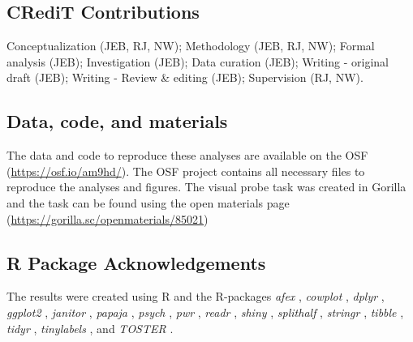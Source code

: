 \documentclass[empirical, authordate]{jote-new-article}
\begin{document}
\subsection{CRediT Contributions}

Conceptualization (JEB, RJ, NW); Methodology (JEB, RJ, NW); Formal analysis (JEB); Investigation (JEB); Data curation (JEB); Writing - original draft (JEB); Writing - Review \& editing (JEB); Supervision (RJ, NW).

\subsection{Data, code, and materials}

The data and code to reproduce these analyses are available on the OSF (\url{https://osf.io/am9hd/}). The OSF project contains all necessary files to reproduce the analyses and figures. The visual probe task was created in Gorilla and the task can be found using the open materials page (\url{https://gorilla.sc/openmaterials/85021})

\subsection{R Package Acknowledgements}

The results were created using R \parencite[version 4.1.3][]{RCoreTeam2020} and the R-packages \emph{afex} \parencite[version 1.0.1][]{Singmann2020}, \emph{cowplot} \parencite[version 1.1.1][]{Wilke2019}, \emph{dplyr} \parencite[version 1.0.10][]{Wickham2020}, \emph{ggplot2} \parencite[version 3.3.5][]{Wickham2016}, \emph{janitor} \parencite[version 2.1.0][]{Firke2019}, \emph{papaja} \parencite[version 0.1.1][]{Aust2022}, \emph{psych} \parencite[version 2.2.3][]{Revelle2019}, \emph{pwr} \parencite[version 1.3.0][]{Champely2020}, \emph{readr} \parencite[version 2.1.2][]{Wickham2018}, \emph{shiny} \parencite[version 1.7.1][]{Chang2020}, \emph{splithalf} \parencite[version 0.8.2][]{Parsons2020}, \emph{stringr} \parencite[version 1.4.0][]{Wickham2019}, \emph{tibble} \parencite[version 3.1.6][]{Müller2020}, \emph{tidyr} \parencite[version 1.2.0][]{Wickham2020}, \emph{tinylabels} \parencite[version 0.2.3][]{Barth2022}, and \emph{TOSTER} \parencite[version 0.4.0][]{Lakens2017}.


\end{document}
